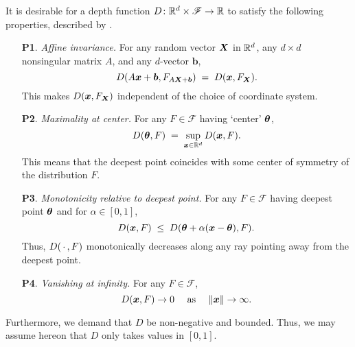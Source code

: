 
It is desirable for a depth function $D\colon \mathbb{R}^d \times \mathscr{F} \to \mathbb{R}$
to satisfy the following properties, described by
\textcite{zuo-serfling-2000}.

\begin{enumerate}
    \item[\textbf{P1}.] \emph{Affine invariance.}
        For any random vector $\bm{X}$ in $\mathbb{R}^d$, any $d \times d$ nonsingular
        matrix $A$, and any $d$-vector $\bm{b}$,
        \begin{equation}
            D(A\bm{x} + \bm{b}, F_{A\bm{X} + \bm{b}}) \;=\; D(\bm{x}, F_{\bm{X}}).
        \end{equation}
        This makes $D(\bm{x}, F_{\bm{X}})$ independent of the choice of coordinate
        system.

    \item[\textbf{P2}.] \emph{Maximality at center.}
        For any $F \in \mathscr{F}$ having `center' $\bm{\theta}$,
        \begin{equation}
            D(\bm{\theta}, F) \;=\; \sup_{\bm{x} \in \mathbb{R}^d} D(\bm{x}, F).
        \end{equation}
        This means that the deepest point coincides with some center of
        symmetry of the distribution $F$.

    \item[\textbf{P3}.] \emph{Monotonicity relative to deepest point.}
        For any $F \in \mathscr{F}$ having deepest point $\bm{\theta}$ and for
        $\alpha \in [0, 1]$,
        \begin{equation}
            D(\bm{x}, F) \;\leq\; D(\bm{\theta} + \alpha(\bm{x} - \bm{\theta}), F).
        \end{equation}
        Thus, $D(\,\cdot\,, F)$ monotonically decreases along any ray pointing
        away from the deepest point.

    \item[\textbf{P4}.] \emph{Vanishing at infinity.}
        For any $F \in \mathscr{F}$,
        \begin{equation}
            D(\bm{x}, F) \to 0 \quad\text{ as }\quad\Vert \bm{x} \Vert \to \infty.
        \end{equation}
\end{enumerate}

Furthermore, we demand that $D$ be non-negative and bounded.
Thus, we may assume hereon that $D$ only takes values in $[0, 1]$.

